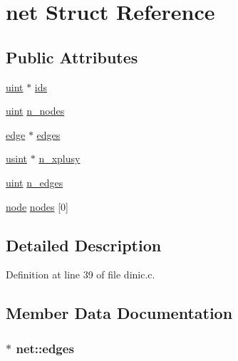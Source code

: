 \hypertarget{structnet}{
\section{net Struct Reference}
\label{structnet}
}
\subsection*{Public Attributes}
\begin{DoxyCompactItemize}
\item 
\hyperlink{dinic_8c_a91ad9478d81a7aaf2593e8d9c3d06a14}{uint} $\ast$ \hyperlink{structnet_a65ad82aa1f6958764f1b013edab176d3}{ids}
\item 
\hyperlink{dinic_8c_a91ad9478d81a7aaf2593e8d9c3d06a14}{uint} \hyperlink{structnet_ab35d5061a46ece7e30e85eba1da28d5f}{n\_\-nodes}
\item 
\hyperlink{structedge}{edge} $\ast$ \hyperlink{structnet_aca1e76b76246e32bac847eb7dda669c9}{edges}
\item 
\hyperlink{dinic_8c_a506074a66ce8223cd574f02ed5c5d9ce}{usint} $\ast$ \hyperlink{structnet_a7b32b1c4800895356bdfe16a25698623}{n\_\-xplusy}
\item 
\hyperlink{dinic_8c_a91ad9478d81a7aaf2593e8d9c3d06a14}{uint} \hyperlink{structnet_a974463f2ba7452a6a24e47f7d367044b}{n\_\-edges}
\item 
\hyperlink{structnode}{node} \hyperlink{structnet_a35da0fe3822c408960175a614825cf6e}{nodes} \mbox{[}0\mbox{]}
\end{DoxyCompactItemize}


\subsection{Detailed Description}


Definition at line 39 of file dinic.c.



\subsection{Member Data Documentation}
\hypertarget{structnet_aca1e76b76246e32bac847eb7dda669c9}{
\subsubsection[{edges}]{$\ast$ {\bf net::edges}}}
\label{structnet_aca1e76b76246e32bac847eb7dda669c9}


